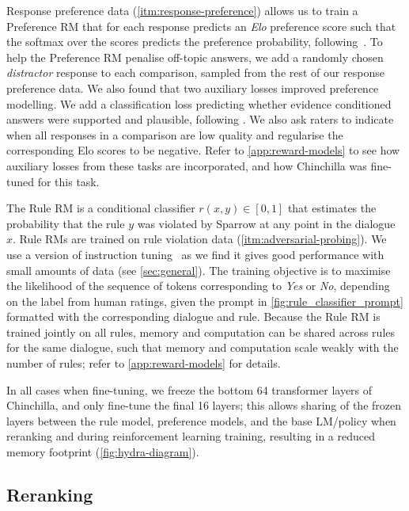 Response preference data (\ref{itm:response-preference}) allows us to train a Preference RM that for each response predicts an \emph{Elo} preference score such that the softmax over the scores predicts the preference probability, following~\citep{stiennon2020learning,menick2022teaching,elo1978rating}. To help the Preference RM penalise off-topic answers, we add a randomly chosen \emph{distractor} response to each comparison, sampled from the rest of our response preference data. We also found that two auxiliary losses improved preference modelling. We add a classification loss predicting whether evidence conditioned answers were supported and plausible, following \citep{menick2022teaching}. We also ask raters to indicate when all responses in a comparison are low quality and regularise the corresponding Elo scores to be negative. Refer to \ref{app:reward-models} to see how auxiliary losses from these tasks are incorporated, and how Chinchilla was fine-tuned for this task.

The Rule RM is a conditional classifier $r(x, y) \in [0, 1]$ that estimates the probability that the rule $y$ was violated by Sparrow at any point in the dialogue $x$. Rule RMs are trained on rule violation data (\ref{itm:adversarial-probing}). 
We use a version of instruction tuning~\citep{gao2020making,wei2021finetuned,saeidi2021cross,kotonya2022policy} as we find it gives good performance with small amounts of data (see \ref{sec:general}). The training objective is to maximise the likelihood of the sequence of tokens corresponding to \emph{Yes} or \emph{No}, depending on the label from human ratings, given the prompt in \ref{fig:rule_classifier_prompt} formatted with the corresponding dialogue and rule. Because the Rule RM is trained jointly on all rules, memory and computation can be shared across rules for the same dialogue, such that memory and computation scale weakly with the number of rules; refer to \ref{app:reward-models} for details.

In all cases when fine-tuning, we freeze the bottom 64 transformer layers of Chinchilla, and only fine-tune the final 16 layers; this allows sharing of the frozen layers between the rule model, preference models, and the base LM/policy when reranking and during reinforcement learning training, resulting in a reduced memory footprint (\ref{fig:hydra-diagram}).

\subsection{Reranking} \label{sec:rerank}

